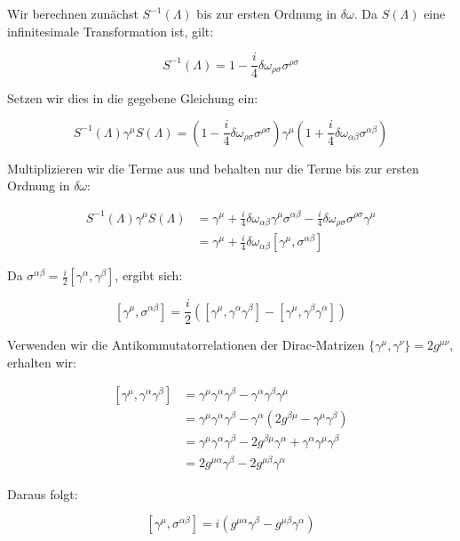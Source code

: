 \documentclass[11pt,a4paper]{article}
\begin{document}
Wir berechnen zunächst $S^{-1}(\Lambda)$ bis zur ersten Ordnung in $\delta \omega$. Da $S(\Lambda)$ eine infinitesimale Transformation ist, gilt:

\[
S^{-1}(\Lambda) = 1 - \frac{i}{4} \delta \omega_{\rho\sigma} \sigma^{\rho\sigma}
\]

Setzen wir dies in die gegebene Gleichung ein:

\[
S^{-1}(\Lambda) \gamma^\mu S(\Lambda) = \left(1 - \frac{i}{4} \delta \omega_{\rho\sigma} \sigma^{\rho\sigma}\right) \gamma^\mu \left(1 + \frac{i}{4} \delta \omega_{\alpha\beta} \sigma^{\alpha\beta}\right)
\]

Multiplizieren wir die Terme aus und behalten nur die Terme bis zur ersten Ordnung in $\delta \omega$:

\[
\begin{align*}
S^{-1}(\Lambda) \gamma^\mu S(\Lambda) &= \gamma^\mu + \frac{i}{4} \delta \omega_{\alpha\beta} \gamma^\mu \sigma^{\alpha\beta} - \frac{i}{4} \delta \omega_{\rho\sigma} \sigma^{\rho\sigma} \gamma^\mu \\
&= \gamma^\mu + \frac{i}{4} \delta \omega_{\alpha\beta} [\gamma^\mu, \sigma^{\alpha\beta}]
\end{align*}
\]

Da $\sigma^{\alpha\beta} = \frac{i}{2} [\gamma^\alpha, \gamma^\beta]$, ergibt sich:

\[
[\gamma^\mu, \sigma^{\alpha\beta}] = \frac{i}{2} \left( [\gamma^\mu, \gamma^\alpha \gamma^\beta] - [\gamma^\mu, \gamma^\beta \gamma^\alpha] \right)
\]

Verwenden wir die Antikommutatorrelationen der Dirac-Matrizen $\{\gamma^\mu, \gamma^\nu\} = 2g^{\mu\nu}$, erhalten wir:

\[
\begin{align*}
[\gamma^\mu, \gamma^\alpha \gamma^\beta] &= \gamma^\mu \gamma^\alpha \gamma^\beta - \gamma^\alpha \gamma^\beta \gamma^\mu \\
&= \gamma^\mu \gamma^\alpha \gamma^\beta - \gamma^\alpha (2g^{\beta\mu} - \gamma^\mu \gamma^\beta) \\
&= \gamma^\mu \gamma^\alpha \gamma^\beta - 2g^{\beta\mu} \gamma^\alpha + \gamma^\alpha \gamma^\mu \gamma^\beta \\
&= 2g^{\mu\alpha} \gamma^\beta - 2g^{\mu\beta} \gamma^\alpha
\end{align*}
\]

Daraus folgt:

\[
[\gamma^\mu, \sigma^{\alpha\beta}] = i (g^{\mu\alpha} \gamma^\beta - g^{\mu\beta} \gamma^\alpha)
\]
\end{document}
